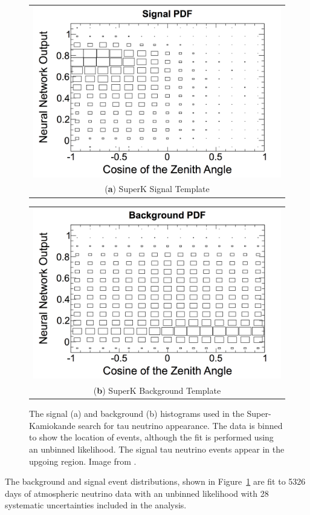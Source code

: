 \begin{figure}[h]
\centering
\begin{tabular}[b]{c}
  \includegraphics[width=0.45\linewidth]{superk_signal.png} \\
  \small (\textbf{\color{ctcolormain}a}) SuperK Signal Template
\end{tabular} \hspace{2pt}
\begin{tabular}[b]{c}
  \includegraphics[width=0.45\linewidth]{superk_background.png} \\
  \small (\textbf{\color{ctcolormain}b}) SuperK Background Template
\end{tabular}
\caption[Signal and background in the Super-Kamiokande analysis]{The signal (a) and background (b) histograms used in the Super-Kamiokande search for tau neutrino appearance. The data is binned to show the location of events, although the fit is performed using an unbinned likelihood. The signal tau neutrino events appear in the upgoing region. Image from \cite{SuperK-Tau2017}.}
\label{fig:superk_histograms}
\end{figure}

The background and signal event distributions, shown in Figure~\ref{fig:superk_histograms} are fit to 5326 days of atmospheric neutrino data with an unbinned likelihood with 28 systematic uncertainties included in the analysis.

